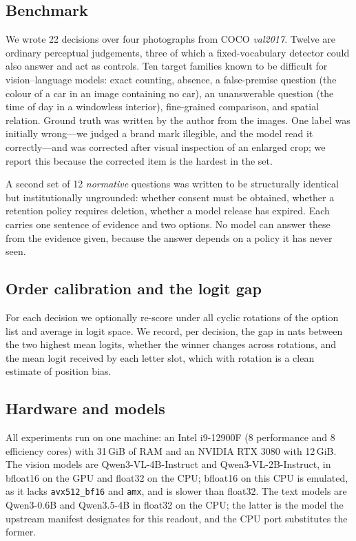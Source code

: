 \documentclass[10pt,twocolumn]{article}
\begin{document}
\subsection{Benchmark}

We wrote 22 decisions over four photographs from COCO \emph{val2017}. Twelve
are ordinary perceptual judgements, three of which a fixed-vocabulary detector
could also answer and act as controls. Ten target families known to be
difficult for vision--language models: exact counting, absence, a false-premise
question (the colour of a car in an image containing no car), an unanswerable
question (the time of day in a windowless interior), fine-grained comparison,
and spatial relation. Ground truth was written by the author from the images.
One label was initially wrong---we judged a brand mark illegible, and the model
read it correctly---and was corrected after visual inspection of an enlarged
crop; we report this because the corrected item is the hardest in the set.

A second set of 12 \emph{normative} questions was written to be structurally
identical but institutionally ungrounded: whether consent must be obtained,
whether a retention policy requires deletion, whether a model release has
expired. Each carries one sentence of evidence and two options. No model can
answer these from the evidence given, because the answer depends on a policy
it has never seen.

\subsection{Order calibration and the logit gap}

For each decision we optionally re-score under all cyclic rotations of the
option list and average in logit space. We record, per decision, the gap in
nats between the two highest mean logits, whether the winner changes across
rotations, and the mean logit received by each letter slot, which with
rotation is a clean estimate of position bias.

\subsection{Hardware and models}

All experiments run on one machine: an Intel i9-12900F (8 performance and 8
efficiency cores) with 31\,GiB of RAM and an NVIDIA RTX 3080 with 12\,GiB.
The vision models are Qwen3-VL-4B-Instruct and Qwen3-VL-2B-Instruct, in
bfloat16 on the GPU and float32 on the CPU; bfloat16 on this CPU is emulated,
as it lacks \texttt{avx512\_bf16} and \texttt{amx}, and is slower than float32. The text
models are Qwen3-0.6B \cite{qwen3} and Qwen3.5-4B in float32 on the CPU; the
latter is the model the upstream manifest \cite{semif} designates for this
readout, and the CPU port substitutes the former.
\end{document}
